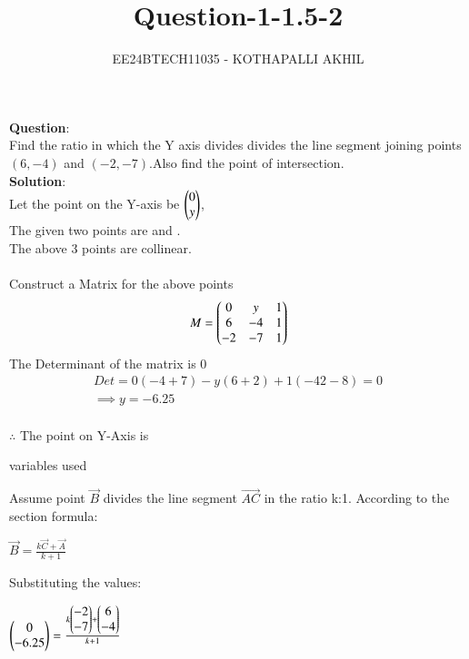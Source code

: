 \documentclass[journal]{IEEEtran}
\numberwithin{equation}{enumi}
\numberwithin{figure}{enumi}
\begin{document}

\title{Question-1-1.5-2}
\author{EE24BTECH11035 - KOTHAPALLI AKHIL}
{\let\newpage\relax\maketitle}
\textbf{Question}:\\
Find the ratio in which the Y axis divides divides the line segment joining points $(6,-4)$ and $(-2,-7)$.Also find the point of intersection.\\
\textbf{Solution}:\\
Let the point on the Y-axis be $\begin{pmatrix}0\\y\end{pmatrix}$, \\ The given two points are  and .  \\
The above 3 points are collinear.\\\\
Construct a Matrix for the above points
\begin{align}
   M= \begin{pmatrix}0 & y & 1\\6 & -4 & 1\\-2 &-7 & 1\end{pmatrix}
\end{align}
The Determinant of the matrix is 0
\begin{align}
   Det=0(-4+7)-y(6+2)+1(-42-8)=0\\
    \implies y=-6.25
\end{align}\\
$\therefore$ The point on Y-Axis is 


\begin{table}[h!]
   \centering
   
   \caption{variables used}
   \label{tabQuestion-1-1.5-17}
\end{table}   
Assume point $\vec{B}$ divides the line segment $\vec{AC}$ in the ratio  k:1.  According to the section formula:

$\vec{B} = \frac{k\vec{C}+\vec{A}}{k+1}$

Substituting the values:

$\begin{pmatrix}0 \\ -6.25\end{pmatrix}  = \frac{k \begin{pmatrix}-2 \\ -7\end{pmatrix} +  \begin{pmatrix}6 \\ -4\end{pmatrix} }{k+1}$
\end{document}
